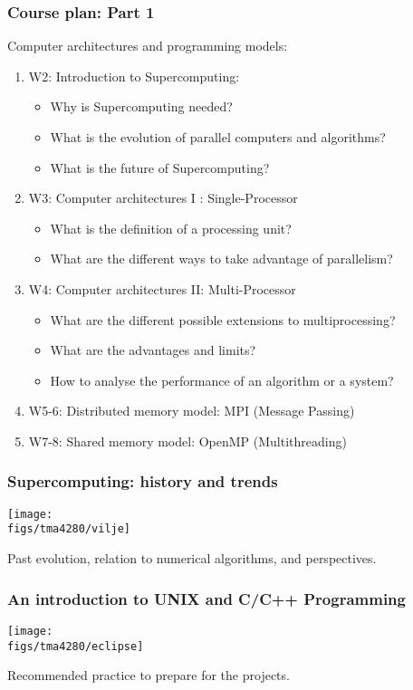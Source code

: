 \begin{frame}
  \frametitle{Course plan: Part 1}

Computer architectures and programming models:
\begin{enumerate}
\item W2: Introduction to Supercomputing:
\begin{itemize}
\item Why is Supercomputing needed?
\item What is the evolution of parallel computers and algorithms?
\item What is the future of Supercomputing?
\end{itemize}
\smallskip
\item W3: Computer architectures I : Single-Processor
\begin{itemize}
\item What is the definition of a processing unit?
\item What are the different ways to take advantage of parallelism?
\end{itemize}
\smallskip
\item W4: Computer architectures II: Multi-Processor
\begin{itemize}
\item What are the different possible extensions to multiprocessing?
\item What are the advantages and limits?
\item How to analyse the performance of an algorithm or a system?
\end{itemize}
\smallskip
\item W5-6: Distributed memory model: MPI (Message Passing)
\item W7-8: Shared memory model: OpenMP (Multithreading)
\end{enumerate}

\end{frame}


\begin{frame}
  \frametitle{Supercomputing: history and trends}
  \begin{center}
    \texttt{[image: \\figs/tma4280/vilje]}
  \end{center}

Past evolution, relation to numerical algorithms, and perspectives.
\end{frame}


\begin{frame}
  \frametitle{An introduction to UNIX and C/C++ Programming}
  \begin{center}
    \texttt{[image: \\figs/tma4280/eclipse]}
  \end{center}

Recommended practice to prepare for the projects.
\end{frame}

